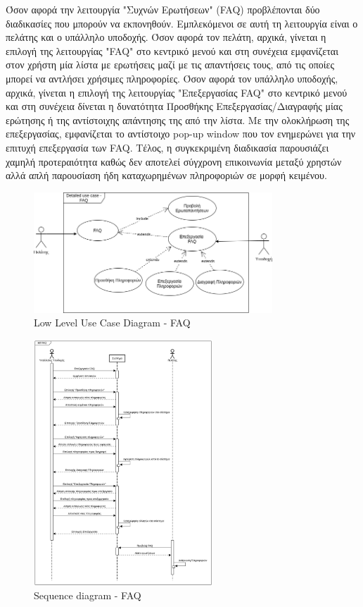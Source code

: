 \noindent
Όσον αφορά την λειτουργία "Συχνών Ερωτήσεων" (FAQ) προβλέπονται δύο διαδικασίες που μπορούν να 
εκπονηθούν. Εμπλεκόμενοι σε αυτή τη λειτουργία είναι ο πελάτης και ο υπάλληλο υποδοχής. Όσον αφορά 
τον πελάτη, αρχικά, γίνεται η επιλογή της λειτουργίας "FAQ" στο κεντρικό μενού και στη συνέχεια 
εμφανίζεται στον χρήστη μία λίστα με ερωτήσεις μαζί με τις απαντήσεις τους, από τις οποίες μπορεί να 
αντλήσει χρήσιμες πληροφορίες. Όσον αφορά τον υπάλληλο υποδοχής, αρχικά, γίνεται η επιλογή της 
λειτουργίας "Επεξεργασίας FAQ" στο κεντρικό μενού και στη συνέχεια δίνεται η δυνατότητα Προσθήκης 
Επεξεργασίας/Διαγραφής μίας ερώτησης ή της αντίστοιχης απάντησης της από την λίστα. Με την 
ολοκλήρωση  της επεξεργασίας, εμφανίζεται το αντίστοιχο  pop-up window που τον ενημερώνει για 
την επιτυχή επεξεργασία των FAQ. Τέλος, η συγκεκριμένη διαδικασία παρουσιάζει χαμηλή προτεραιότητα
καθώς δεν αποτελεί σύγχρονη επικοινωνία μεταξύ χρηστών αλλά απλή παρουσίαση ήδη καταχωρημένων
πληροφοριών σε μορφή κειμένου.\\
\begin{figure}[H]
	\centering
	\includegraphics[width=0.8\textwidth]{Images/Low_level_use_case-FAQ}
	\caption{Low Level Use Case Diagram - FAQ}
	\label{Low_level_use_case - FAQ}
\end{figure}

\begin{figure}[H]
	\centering
	\includegraphics[width=0.6\textwidth]{Images/sequence-FAQ}
	\caption{Sequence diagram - FAQ}
	\label{Sequence_diagram - FAQ}
\end{figure}
\clearpage

